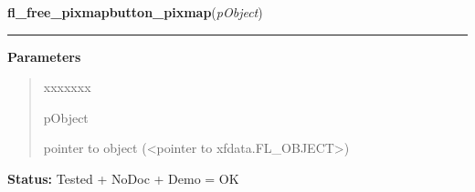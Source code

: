     \label{xformslib:library:fl_free_pixmap_pixmap}

    \vspace{0.5ex}

\hspace{.8\funcindent}\begin{boxedminipage}{\funcwidth}

    \raggedright \textbf{fl\_free\_pixmapbutton\_pixmap}(\textit{pObject})

    \vspace{-1.5ex}

    \rule{\textwidth}{0.5\fboxrule}
\setlength{\parskip}{2ex}
\setlength{\parskip}{1ex}
      \textbf{Parameters}
      \vspace{-1ex}

      \begin{quote}
        \begin{Ventry}{xxxxxxx}

          \item[pObject]

          pointer to object ({\textless}pointer to 
          xfdata.FL\_OBJECT{\textgreater})

        \end{Ventry}

      \end{quote}

\textbf{Status:} Tested + NoDoc + Demo = OK



    \end{boxedminipage}

    \label{xformslib:library:fl_get_pixmap_pixmap}

    \vspace{0.5ex}

